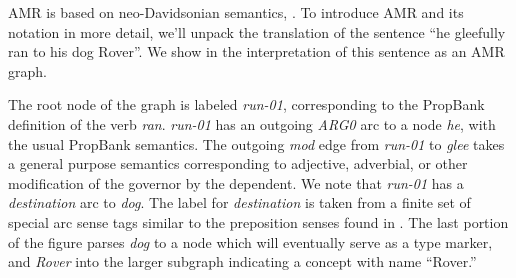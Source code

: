 \documentclass[11pt]{article}
\newcommand\w[1]{\textit{#1}} %
\newcommand\e[1]{\textit{#1}} %
\newcommand\n[1]{\textit{#1}} %
\begin{document}
AMR is based on neo-Davidsonian semantics, \cite{Davidson:1967,Parsons:1990}.
To introduce AMR and its notation in more detail, we'll unpack the translation of the sentence ``he gleefully ran to his dog Rover''. 
We show in  the interpretation of this sentence as an AMR graph.


The root node of the graph is labeled \n{run-01}, corresponding to the PropBank \cite{palmer2005proposition-srl} definition of the verb \w{ran}.
\w{run-01} has an outgoing \e{ARG0} arc to a node \w{he}, with the usual PropBank semantics.
The outgoing \e{mod} edge from \n{run-01} to \n{glee} takes a general purpose semantics corresponding to adjective, adverbial, or other modification of the governor by the dependent.
We note that \n{run-01} has a \e{destination} arc to \n{dog}.
The label for \e{destination} is taken from a finite set of special arc sense tags similar to the preposition senses found in \cite{srikumar2013-srl}.
The last portion of the figure parses \w{dog} to a node which will eventually serve as a type marker, and \w{Rover} into the larger subgraph indicating a concept with name ``Rover.''


%
\end{document}
